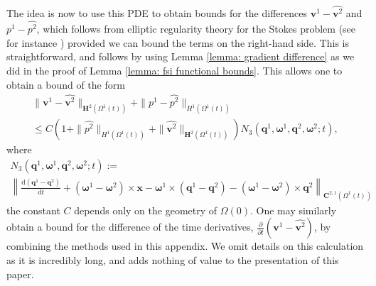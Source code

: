 \documentclass[a4paper]{amsart}
\numberwithin{equation}{section}
\newcommand{\ddt}[1]{\frac{\partial #1}{\partial t}}
\theoremstyle{plain}
\newcommand{\mbf}[1]{\mathbf{#1}}
\begin{document}
The idea is now to use this PDE to obtain bounds for the differences $\mbf{v}^1 - \widehat{\mbf{v}^2}$ and $p^1 -  \widehat{p^2}$, which follows from elliptic regularity theory for the Stokes problem (see for instance \cite{galdi2011introduction}) provided we can bound the terms on the right-hand side.
This is straightforward, and follows by using Lemma \ref{lemma: gradient difference} as we did in the proof of Lemma \ref{lemma: fsi functional bounds}.
This allows one to obtain a bound of the form
\begin{multline}
    \|\mbf{v}^1 - \widehat{\mbf{v}^2}\|_{\mbf{H}^2(\Omega^1(t))} + \|p^1 - \widehat{p^2}\|_{H^1(\Omega^1(t))}\\
    \leq C\left( 1 + \|\widehat{p^2}\|_{H^1(\Omega^1(t))} + \| \widehat{\mbf{v}^2} \|_{\mbf{H}^2(\Omega^1(t))}  \right)N_3(\mbf{q}^1, \boldsymbol{\omega}^1,\mbf{q}^2, \boldsymbol{\omega}^2;t),
    \label{stokes regularity5}
\end{multline}
where
\begin{multline*}
N_3(\mbf{q}^1, \boldsymbol{\omega}^1,\mbf{q}^2, \boldsymbol{\omega}^2;t):=\\
 \left\|\frac{\mathrm{d}(\mbf{q}^1-\mbf{q}^2)}{\mathrm{d}t} + (\boldsymbol{\omega}^1 - \boldsymbol{\omega}^2)\times \mbf{x} - \boldsymbol{\omega}^1 \times (\mbf{q}^1 - \mbf{q}^2) - (\boldsymbol{\omega}^1 - \boldsymbol{\omega}^2)\times \mbf{q}^2 \right\|_{\mbf{C}^{2,1}(\Omega^1(t))}
\end{multline*}
the constant $C$ depends only on the geometry of $\Omega(0)$.
One may similarly obtain a bound for the difference of the time derivatives, $\ddt{}(\mbf{v}^1 - \widehat{\mbf{v}^2})$, by combining the methods used in this appendix.
We omit details on this calculation as it is incredibly long, and adds nothing of value to the presentation of this paper.



\end{document}
